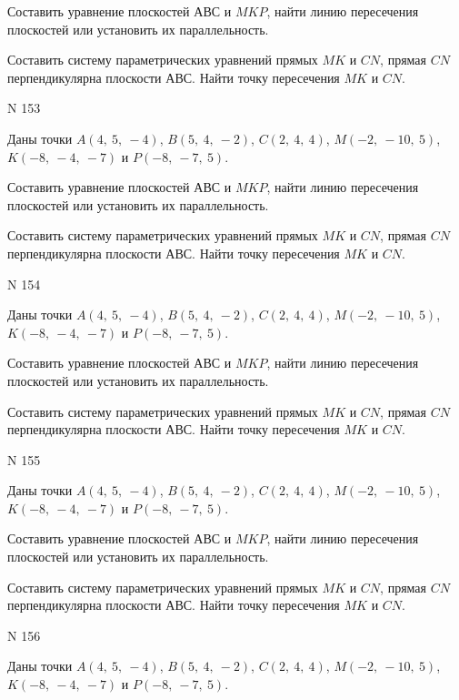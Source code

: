 \documentclass[11pt]{report}
\begin{document}
Составить уравнение плоскостей $АВС$ и $MKP$,
найти линию пересечения плоскостей или установить их параллельность.

Составить систему параметрических уравнений прямых $MK$ и $CN$,
прямая $CN$ перпендикулярна плоскости $АВС$. 
Найти точку пересечения $MK$ и $CN$.



 N 153

Даны точки $A\left( 4, \  5, \  -4\right)$, $B\left( 5, \  4, \  -2\right)$, $C\left( 2, \  4, \  4\right)$, $M\left( -2, \  -10, \  5\right)$, $K\left( -8, \  -4, \  -7\right)$ и $P\left( -8, \  -7, \  5\right)$.


Составить уравнение плоскостей $АВС$ и $MKP$,
найти линию пересечения плоскостей или установить их параллельность.

Составить систему параметрических уравнений прямых $MK$ и $CN$,
прямая $CN$ перпендикулярна плоскости $АВС$. 
Найти точку пересечения $MK$ и $CN$.



 N 154

Даны точки $A\left( 4, \  5, \  -4\right)$, $B\left( 5, \  4, \  -2\right)$, $C\left( 2, \  4, \  4\right)$, $M\left( -2, \  -10, \  5\right)$, $K\left( -8, \  -4, \  -7\right)$ и $P\left( -8, \  -7, \  5\right)$.


Составить уравнение плоскостей $АВС$ и $MKP$,
найти линию пересечения плоскостей или установить их параллельность.

Составить систему параметрических уравнений прямых $MK$ и $CN$,
прямая $CN$ перпендикулярна плоскости $АВС$. 
Найти точку пересечения $MK$ и $CN$.



 N 155

Даны точки $A\left( 4, \  5, \  -4\right)$, $B\left( 5, \  4, \  -2\right)$, $C\left( 2, \  4, \  4\right)$, $M\left( -2, \  -10, \  5\right)$, $K\left( -8, \  -4, \  -7\right)$ и $P\left( -8, \  -7, \  5\right)$.


Составить уравнение плоскостей $АВС$ и $MKP$,
найти линию пересечения плоскостей или установить их параллельность.

Составить систему параметрических уравнений прямых $MK$ и $CN$,
прямая $CN$ перпендикулярна плоскости $АВС$. 
Найти точку пересечения $MK$ и $CN$.



 N 156

Даны точки $A\left( 4, \  5, \  -4\right)$, $B\left( 5, \  4, \  -2\right)$, $C\left( 2, \  4, \  4\right)$, $M\left( -2, \  -10, \  5\right)$, $K\left( -8, \  -4, \  -7\right)$ и $P\left( -8, \  -7, \  5\right)$.
\end{document}
